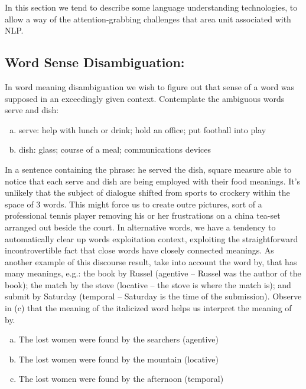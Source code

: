 In this section we tend to describe some language understanding technologies, to allow a way of the attention-grabbing challenges that area unit associated with NLP.
\subsection{Word Sense Disambiguation:}
In word meaning disambiguation we wish to figure out that sense of a word was supposed in an exceedingly given context. Contemplate the ambiguous words serve and dish:

\begin{enumerate}[a.]
    \item serve: help with lunch or drink; hold an office; put football into play
    \item dish: glass; course of a meal; communications devices    
\end{enumerate}
In a sentence containing the phrase: he served the dish, square measure able to notice that each serve and dish are being employed with their food meanings. It's unlikely that the subject of dialogue shifted from sports to crockery within the space of 3 words. This might force us to create outre pictures, sort of a professional tennis player removing his or her frustrations on a china tea-set arranged out beside the court. In alternative words, we have a tendency to automatically clear up words exploitation context, exploiting the straightforward incontrovertible fact that close words have closely connected meanings. As another example of this discourse result, take into account the word by, that has many meanings, e.g.: the book by Russel (agentive -- Russel was the author of the book); the match by the stove (locative -- the stove is where the match is); and submit by Saturday (temporal -- Saturday is the time of the submission). Observe in (c) that the meaning of the italicized word helps us interpret the meaning of by.

\begin{enumerate}[a.]
    \item The lost women were found by the searchers (agentive)
    \item The lost women were found by the mountain (locative)
    \item The lost women were found by the afternoon (temporal)    
\end{enumerate}

